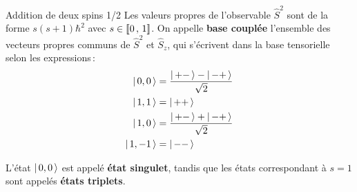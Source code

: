         \begin{omed}{Addition de deux spins 1/2}
            Les valeurs propres de l’observable $\hat{S}^2$ sont de la forme $s(s+1)\hbar^2$ avec $s \in \left[\!\left[ 0 \, , \, 1 \right]\!\right]$. On appelle \textbf{base couplée} l’ensemble des vecteurs propres communs de $\hat{S}^2$ et $\hat{S}_z$, qui s’écrivent dans la base tensorielle selon les expressions :
            \begin{align*}
                \left| \, 0,0 \, \right> &= \frac{\left| \, +- \, \right> - \left| \, -+ \, \right>}{\sqrt{2}} \\
                \left| \, 1,1 \, \right> &= \left| \, ++ \, \right> \\
                \left| \, 1,0 \, \right> &=  \frac{\left| \, +- \, \right> + \left| \, -+ \, \right>}{\sqrt{2}} \\
                \left| \, 1,-1 \, \right> &= \left| \, -- \, \right> \\
            \end{align*}
        \end{omed}

        L’état $\left| \, 0,0 \, \right>$ est appelé \textbf{état singulet}, tandis que les états correspondant à $s = 1$ sont appelés \textbf{états triplets}.

